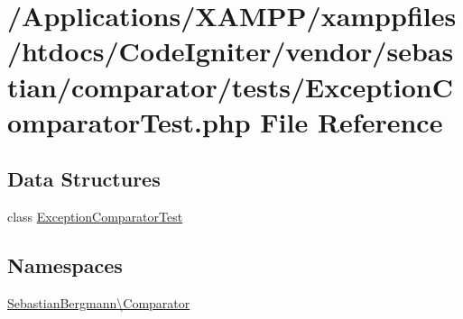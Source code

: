 \hypertarget{_exception_comparator_test_8php}{}\section{/\+Applications/\+X\+A\+M\+P\+P/xamppfiles/htdocs/\+Code\+Igniter/vendor/sebastian/comparator/tests/\+Exception\+Comparator\+Test.php File Reference}
\label{_exception_comparator_test_8php}
\subsection*{Data Structures}
\begin{DoxyCompactItemize}
\item 
class \mbox{\hyperlink{class_sebastian_bergmann_1_1_comparator_1_1_exception_comparator_test}{Exception\+Comparator\+Test}}
\end{DoxyCompactItemize}
\subsection*{Namespaces}
\begin{DoxyCompactItemize}
\item 
 \mbox{\hyperlink{namespace_sebastian_bergmann_1_1_comparator}{Sebastian\+Bergmann\textbackslash{}\+Comparator}}
\end{DoxyCompactItemize}
